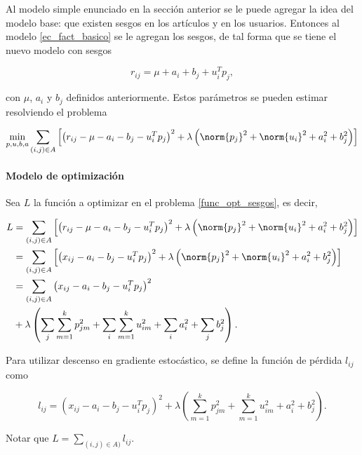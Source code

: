 Al modelo simple enunciado en la sección anterior se le puede agregar la idea del modelo base: que existen sesgos en los artículos y en los usuarios. Entonces al modelo \ref{ec_fact_basico} se le agregan los sesgos, de tal forma que se tiene el nuevo modelo con sesgos

\begin{equation}\label{ec_fact_sesgo}
r_{ij} = \mu + a_i + b_j + u_i^T p_j,
\end{equation}

con $\mu$, $a_i$ y $b_j$ definidos anteriormente. Estos parámetros se pueden estimar resolviendo el problema

\begin{equation}\label{func_opt_sesgos}
  \min_{p, u, b, a} \sum_{(i,j) \in A} \left [ \left( r_{ij} - \mu - a_i - b_j - u_i^T p_j \right) ^2 + \lambda \left( \norm{p_j}^2 + \norm{u_i}^2 + a_i^2 + b_j^2 \right) \right ]
\end{equation}

\paragraph{Modelo de optimización}

Sea $L$ la función a optimizar en el problema \ref{func_opt_sesgos}, es decir,

\[
\begin{split}
L 
& = \sum_{(i,j) \in A} \left [ \left( r_{ij} - \mu - a_i - b_j - u_i^T p_j \right) ^2 + 
\lambda \left( \norm{p_j}^2 + \norm{u_i}^2 + a_i^2 + b_j^2 \right) \right ] \\
& = \sum_{(i,j) \in A} \left [ \left( x_{ij} - a_i - b_j - u_i^T p_j \right) ^2 + \lambda \left( \norm{p_j}^2 + \norm{u_i}^2 + a_i^2 + b_j^2 \right) \right ] \\
& = \sum_{(i,j) \in A} \left( x_{ij} - a_i - b_j - u_i^T p_j \right) ^2 \\
& + \lambda \left( 
\sum_j \sum_{m = 1}^{k}p_{jm}^2 + 
\sum_i \sum_{m = 1}^{k}u_{im}^2 + 
\sum_i a_i^2 + 
\sum_j b_j^2 \right) .
\end{split}
\]

Para utilizar descenso en gradiente estocástico, se define la función de pérdida $l_{ij}$ como

\[
l_{ij} = \left( x_{ij} - a_i - b_j - u_i^T p_j \right) ^2
+ \lambda \left( 
\sum_{m = 1}^{k}p_{jm}^2 + 
\sum_{m = 1}^{k}u_{im}^2 + 
a_i^2 + 
b_j^2 \right) .
\]

Notar que $L = \sum_{(i,j) \in A)} l_{ij}$.

